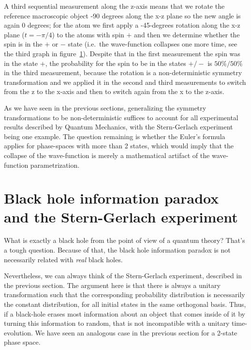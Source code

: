 \documentclass[11pt]{book}
\begin{document}
A third sequential measurement along the z-axis means that we rotate the
reference macroscopic object -90 degrees along the x-z plane so the new
angle is again 0 degrees; for the atom we first apply a -45-degrees
rotation along the x-z plane (\(t=-\pi/4\)) to the atoms with spin \(+\)
and then we determine whether the spin is in the \(+\) or \(-\) state
(i.e.~the wave-function collapses one more time, see the third graph in
figure~\protect\hyperlink{sgseq}{1}). Despite that in the first
measurement the spin was in the state \(+\), the probability for the
spin to be in the states \(+/-\) is \(50\%/50\%\) in the third
measurement, because the rotation is a non-deterministic symmetry
transformation and we applied it in the second and third measurements to
switch from the z to the x-axis and then to switch again from the x to
the z-axis.

As we have seen in the previous sections, generalizing the symmetry
transformations to be non-deterministic suffices to account for all
experimental results described by Quantum Mechanics, with the
Stern-Gerlach experiment being one example. The question remaining is
whether the Euler's formula applies for phase-spaces with more than 2
states, which would imply that the collapse of the wave-function is
merely a mathematical artifact of the wave-function parametrization.

\hypertarget{black-hole-information-paradox-and-the-stern-gerlach-experiment}{%
\section{Black hole information paradox and the Stern-Gerlach
experiment}\label{black-hole-information-paradox-and-the-stern-gerlach-experiment}}

What is exactly a black hole from the point of view of a quantum theory?
That's a tough question. Because of that, the black hole information
paradox\cite{Marolf:2017jkr}\cite{Danielson:2022tdw} is not necessarily related with \emph{real} black holes.

Nevertheless, we can always think of the Stern-Gerlach experiment,
described in the previous section. The argument here is that there is
always a unitary transformation such that the corresponding probability
distribution is necessarily the constant distribution, for all initial
states in the same orthogonal basis. Thus, if a black-hole erases most
information about an object that comes inside of it by turning this
information to random, that is not incompatible with a unitary
time-evolution. We have seen an analogous case in the previous section
for a 2-state phase space.
\end{document}
